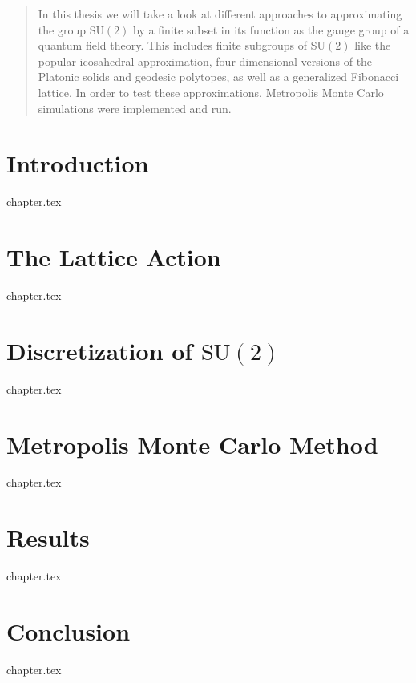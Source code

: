 \documentclass[a4paper,twoside]{scrartcl}
\newcommand{\SUTwo}{$\mathrm{SU}(2)$\xspace}
\begin{document}


\begin{abstract}
 In this thesis we will take a look at different approaches to approximating the group \SUTwo by a finite subset in its function as the gauge group of a quantum field theory. This includes finite subgroups of \SUTwo like the popular icosahedral approximation, four-dimensional versions of the Platonic solids and geodesic polytopes, as well as a generalized Fibonacci lattice. In order to test these approximations, Metropolis Monte Carlo simulations were implemented and run.
\end{abstract}

\tableofcontents
\newpage

\section{Introduction}

{chapter.tex}

\section{The Lattice Action}
{chapter.tex}

\section{Discretization of \SUTwo}
\label{sec:discSu2}
{chapter.tex}

\section{Metropolis Monte Carlo Method}
{chapter.tex}

\section{Results}
\label{sec:results}
{chapter.tex}

\section{Conclusion}
\label{sec:conclusion}
{chapter.tex}

\printbibliography
\end{document}
